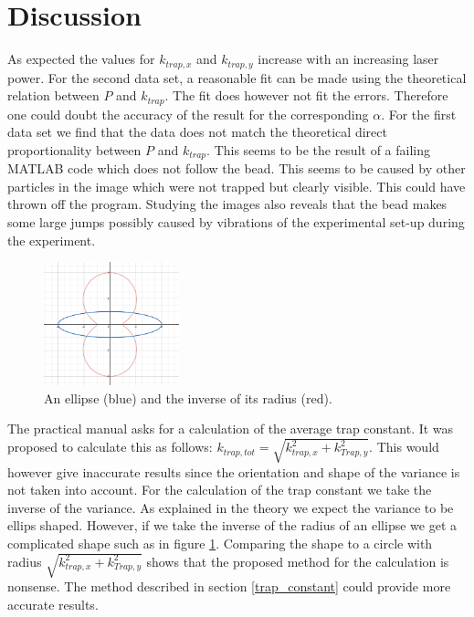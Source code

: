\section{Discussion}
As expected the values for $k_{trap,x}$ and $k_{trap,y}$ increase with an increasing laser power. For the second data set, a reasonable fit can be made using the theoretical relation between $P$ and $k_{trap}$. The fit does however not fit the errors. Therefore one could doubt the accuracy of the result for the corresponding $\alpha$. For the first data set we find that the data does not match the theoretical direct proportionality between $P$ and $k_{trap}$. This seems to be the result of a failing MATLAB code which does not follow the bead. This seems to be caused by other particles in the image  which were not trapped but clearly visible. This could have thrown off the program. Studying the images also reveals that the bead makes some large jumps possibly caused by vibrations of the experimental set-up during the experiment.  \
\begin{figure}
    \centering
    \includegraphics[width=0.35\textwidth,keepaspectratio]{figures/ellipse_inverse.png}
    \caption{An ellipse (blue) and the inverse of its radius (red).}
    \label{fig_ellipse_inverse}
\end{figure}
The practical manual asks for a calculation of the average trap constant. It was proposed to calculate this as follows: $k_{trap,tot} = \sqrt{k_{trap,x}^2 + k_{Trap,y}^2}$. This would however give inaccurate results since the orientation and shape of the variance is not taken into account. For the calculation of the trap constant we take the inverse of the variance. As explained in the theory we expect the variance to be ellips shaped. However, if we take the inverse of the radius of an ellipse we get a complicated shape such as in figure \ref{fig_ellipse_inverse}. Comparing the shape to a circle with radius $\sqrt{k_{trap,x}^2 + k_{Trap,y}^2}$ shows that the proposed method for the calculation is nonsense. The method described in section \ref{trap_constant} could provide more accurate results. \\
